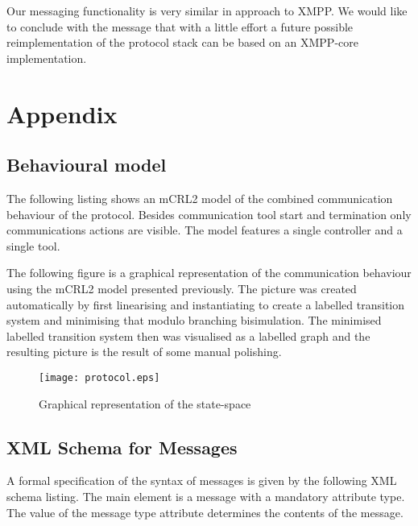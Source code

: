 \documentclass{article}
\begin{document}
   Our messaging functionality is very similar in approach to XMPP. We would
   like to conclude with the message that with a little effort a future
   possible reimplementation of the protocol stack can be based on an XMPP-core
   implementation.

  \enlargethispage*{4pt}
  

  \section{Appendix}
  \pagestyle{empty}

  \subsection{Behavioural model}
  The following listing shows an mCRL2 model of the combined communication
  behaviour of the protocol. Besides communication tool start and termination
  only communications actions are visible. The model features a single
  controller and a single tool.

  \small  \normalsize

  \pagebreak

  The following figure is a graphical representation of the communication
  behaviour using the mCRL2 model presented previously. The picture was created
  automatically by first linearising and instantiating to create a labelled
  transition system and minimising that modulo branching bisimulation. The
  minimised labelled transition system then was visualised as a labelled graph
  and the resulting picture is the result of some manual polishing.

  \begin{figure}[H]
   \texttt{[image: protocol.eps]}
   \caption{Graphical representation of the state-space}
  \end{figure}

  \subsection{XML Schema for Messages}

  A formal specification of the syntax of messages is given by the following
  XML schema listing. The main element is a message with a mandatory attribute
  type. The value of the message type attribute determines the contents of the
  message.
\end{document}
